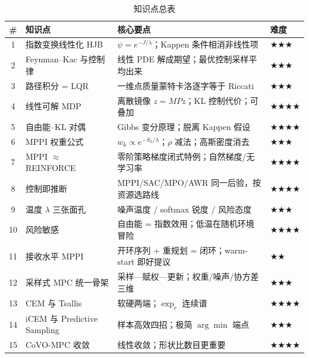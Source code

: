 \begin{table}[H]\centering\small
\caption{知识点总表}
\begin{tabular}{clll}
\toprule
\# & 知识点 & 核心要点 & 难度 \\
\midrule
1 & 指数变换线性化 HJB & $\psi=e^{-J/\lambda}$；Kappen 条件相消非线性项 & \(\bigstar\bigstar\bigstar\) \\
2 & Feynman--Kac 与控制律 & 线性 PDE 解成期望；最优控制采样平均出来 & \(\bigstar\bigstar\bigstar\) \\
3 & 路径积分 = LQR & 一维点质量蒙特卡洛逐字等于 Riccati & \(\bigstar\bigstar\bigstar\) \\
4 & 线性可解 MDP & 离散镜像 $z=MPz$；KL 控制代价；可叠加 & \(\bigstar\bigstar\bigstar\bigstar\) \\
5 & 自由能--KL 对偶 & Gibbs 变分原理；脱离 Kappen 假设 & \(\bigstar\bigstar\bigstar\bigstar\) \\
6 & MPPI 权重公式 & $w_k\propto e^{-S_k/\lambda}$；$\rho$ 减法；高斯密度消去 & \(\bigstar\bigstar\bigstar\) \\
7 & MPPI $\approx$ REINFORCE & 零阶策略梯度闭式特例；自然梯度/无学习率 & \(\bigstar\bigstar\bigstar\bigstar\) \\
8 & 控制即推断 & MPPI/SAC/MPO/AWR 同一后验，按资源选路线 & \(\bigstar\bigstar\bigstar\bigstar\) \\
9 & 温度 $\lambda$ 三张面孔 & 噪声温度 / softmax 锐度 / 风险态度 & \(\bigstar\bigstar\bigstar\) \\
10 & 风险敏感 & 自由能 = 指数效用；低温在随机环境冒险 & \(\bigstar\bigstar\bigstar\bigstar\) \\
11 & 接收水平 MPPI & 开环序列 + 重规划 = 闭环；warm-start 即好提议 & \(\bigstar\bigstar\) \\
12 & 采样式 MPC 统一骨架 & 采样—赋权—更新；权重/噪声/协方差三维 & \(\bigstar\bigstar\bigstar\) \\
13 & CEM 与 Tsallis & 软硬两端；$\exp_r$ 连续谱 & \(\bigstar\bigstar\bigstar\bigstar\) \\
14 & iCEM 与 Predictive Sampling & 样本高效四招；极简 $\arg\min$ 端点 & \(\bigstar\bigstar\bigstar\) \\
15 & CoVO-MPC 收敛 & 线性收敛；形状比数目更重要 & \(\bigstar\bigstar\bigstar\bigstar\) \\
\bottomrule
\end{tabular}
\end{table}

